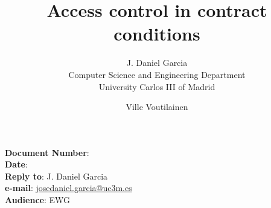 \documentclass[10pt,a4paper,oneside,final,notitlepage]{article}%
\begin{document}


\noindent
\textbf{Document Number}: \texttt{\paperid}\\
\textbf{Date}: \paperdate\\
\textbf{Reply to}: J. Daniel Garcia\\ 
\textbf{e-mail}: \url{josedaniel.garcia@uc3m.es}\\
\textbf{Audience}: EWG\\

\title{Access control in contract conditions}
\author{J. Daniel Garcia\\
Computer Science and Engineering Department\\
University Carlos III of Madrid
\and
Ville Voutilainen
}
\date{}

\begingroup
\let\newpage\relax%
\maketitle
\endgroup





\end{document}
